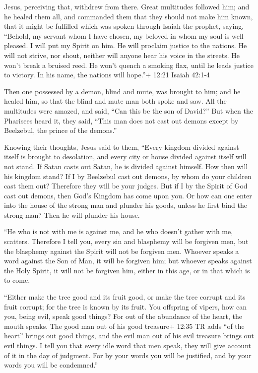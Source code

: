  Jesus, perceiving that, withdrew from there. Great
multitudes followed him; and he healed them all,  and
commanded them that they should not make him known,  that
it might be fulfilled which was spoken through Isaiah the prophet,
saying,  ``Behold, my servant whom I have chosen, my
beloved in whom my soul is well pleased. I will put my Spirit on him. He
will proclaim justice to the nations.  He will not strive,
nor shout, neither will anyone hear his voice in the streets.
 He won't break a bruised reed. He won't quench a smoking
flax, until he leads justice to victory.  In his name, the
nations will hope.''+ 12:21 Isaiah 42:1-4

 Then one possessed by a demon, blind and mute, was brought
to him; and he healed him, so that the blind and mute man both spoke and
saw.  All the multitudes were amazed, and said, ``Can this
be the son of David?''  But when the Pharisees heard it,
they said, ``This man does not cast out demons except by Beelzebul, the
prince of the demons.''

 Knowing their thoughts, Jesus said to them, ``Every
kingdom divided against itself is brought to desolation, and every city
or house divided against itself will not stand.  If Satan
casts out Satan, he is divided against himself. How then will his
kingdom stand?  If I by Beelzebul cast out demons, by whom
do your children cast them out? Therefore they will be your judges.
 But if I by the Spirit of God cast out demons, then God's
Kingdom has come upon you.  Or how can one enter into the
house of the strong man and plunder his goods, unless he first bind the
strong man? Then he will plunder his house.

 ``He who is not with me is against me, and he who doesn't
gather with me, scatters.  Therefore I tell you, every sin
and blasphemy will be forgiven men, but the blasphemy against the Spirit
will not be forgiven men.  Whoever speaks a word against
the Son of Man, it will be forgiven him; but whoever speaks against the
Holy Spirit, it will not be forgiven him, either in this age, or in that
which is to come.

 ``Either make the tree good and its fruit good, or make
the tree corrupt and its fruit corrupt; for the tree is known by its
fruit.  You offspring of vipers, how can you, being evil,
speak good things? For out of the abundance of the heart, the mouth
speaks.  The good man out of his good treasure+ 12:35 TR
adds ``of the heart'' brings out good things, and the evil man out of
his evil treasure brings out evil things.  I tell you that
every idle word that men speak, they will give account of it in the day
of judgment.  For by your words you will be justified, and
by your words you will be condemned.''

